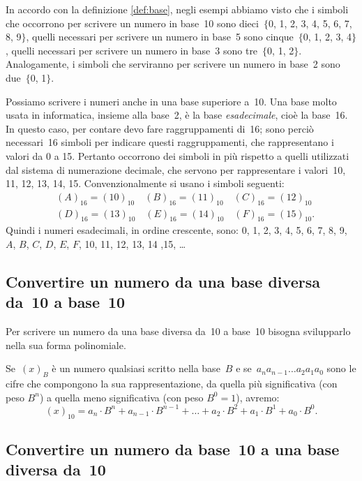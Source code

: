 In accordo con la definizione \ref{def:base}, negli esempi abbiamo visto che i simboli
che occorrono per scrivere un numero in base~10 sono
dieci~$\{$0, 1, 2, 3, 4, 5, 6, 7, 8, 9$\}$, quelli necessari per scrivere un numero
in base~5 sono cinque~$\{$0, 1, 2, 3, 4$\}$, quelli necessari per
scrivere un numero in base~3 sono tre~$\{$0, 1, 2$\}$. Analogamente, i
simboli che serviranno per scrivere un numero in base~2 sono
due~$\{$0, 1$\}$.

Possiamo scrivere i numeri anche in una base superiore a~10. Una base
molto usata in informatica, insieme alla base~2, è
la base \emph{esadecimale}, cioè la base~16.
In questo caso, per contare devo fare raggruppamenti di~16; sono
perciò necessari~16 simboli per indicare questi raggruppamenti, che rappresentano i valori da 0 a 15.
Pertanto occorrono dei simboli in più rispetto a quelli utilizzati dal sistema di numerazione decimale, che servono per rappresentare i valori~10, 11, 12, 13, 14, 15. Convenzionalmente si usano i simboli seguenti:
 \begin{align*}
 &(A)_{16}=(10)_{10}\quad (B)_{16}=(11)_{10}\quad (C)_{16}=(12)_{10}\\%
 &(D)_{16}=(13)_{10}\quad (E)_{16}=(14)_{10}\quad (F)_{16}=(15)_{10}.
 \end{align*}
Quindi i numeri esadecimali, in ordine crescente, sono: 0, 1, 2, 3, 4, 5, 6, 7, 8, 9, $A$, $B$, $C$, $D$, $E$, $F$, 10, 11, 12, 13, 14 ,15, \ldots


\subsection{Convertire un numero da una base diversa da~10 a base~10}

Per scrivere un numero da una base diversa da~10 a base~10 bisogna
svilupparlo nella sua forma polinomiale.

Se~$(x)_{B}$ è un numero qualsiasi scritto nella base~$B$ e
se~$a_{n} a_{n-1} \ldots a_{2} a_{1} a_{0}$ sono le cifre che compongono la sua rappresentazione,
da quella più significativa (con peso $B^n$) a quella meno significativa (con peso $B^0=1$), avremo:
\[(x)_{10}=a_{n}\cdot B^{n}+ a_{n-1}\cdot B^{n-1}+ \ldots%
+ a_{2}\cdot B^{2}+ a_{1}\cdot B^{1}+ a_{0}\cdot B^{0}.\]

\ovalbox{\risolvii \ref{ese:4.1}, \ref{ese:4.2}, \ref{ese:4.3}, \ref{ese:4.4}, \ref{ese:4.5}}

\subsection{Convertire un numero da base~10 a una base diversa da~10}

